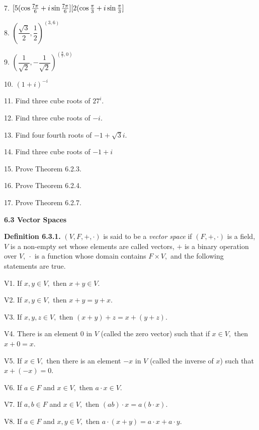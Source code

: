 7. 	$[5(\cos \frac{7\pi}{6} + i\sin \frac{7\pi}{6}][2(\cos \frac{\pi}{3} + i\sin \frac{\pi}{3}] $\nl

\begin{large}
8.  $\left(\dfrac{\sqrt{3}}{2}, \dfrac{1}{2}\right)^{(3,6)}$\nl

9.  $\left(\dfrac{1}{\sqrt{2}}, -\dfrac{1}{\sqrt{2}}\right)^{\left(\frac{8}{7},0\right)}$\nl

10.  $(1 + i)^{-i}$\nl

\end{large}


11. Find three cube roots of $27^{i}.$\nl

12. Find three cube roots of $-i.$\nl

13. Find four fourth roots of $-1 + \sqrt{3}i.$\nl

14. Find three cube roots of $-1 + i$\nl

15. Prove Theorem 6.2.3. \nl

16. Prove Theorem 6.2.4. \nl

17. Prove Theorem 6.2.7. \nl


\newpage
\textbf{6.3 Vector Spaces}\nl

\textbf{Definition 6.3.1.} $(V,F,+,\cdot)$ is said to be a \textit{vector space} if $(F,+,\cdot)$ is a field, $V$ is a non-empty set whose elements are called vectors, $+$ is a binary operation over $V,~ \cdot$ is a function whose domain contains $F\times V,$ and the following statements are true. \nl

\qquad V1. If $x,y\in V,$ then $x + y\in V.$ \nl

\qquad V2. If $x,y\in V,$ then $x + y = y + x.$ \nl

\qquad V3. If $x,y,z\in V,$ then $(x + y) + z = x + (y + z).$ \nl

\qquad V4. There is an element $0$ in $V$ (called the zero vector) such that
if $x\in V,$ then $x + 0 = x.$ \nl

\qquad V5. If $x\in V,$ then there is an element $-x$ in $V$ (called the inverse
of $x$) such that $x + (-x) = 0.$ \nl

\qquad V6. If $a\in F$ and $x\in V,$ then $a\cdot x\in V.$ \nl

\qquad V7. If $a,b\in F$ and $x\in V,$ then $(ab)\cdot x = a(b\cdot x).$ \nl

\qquad V8. If $a\in F$ and $x,y\in V,$ then $a\cdot(x + y) =a\cdot x + a\cdot y.$ \nl

